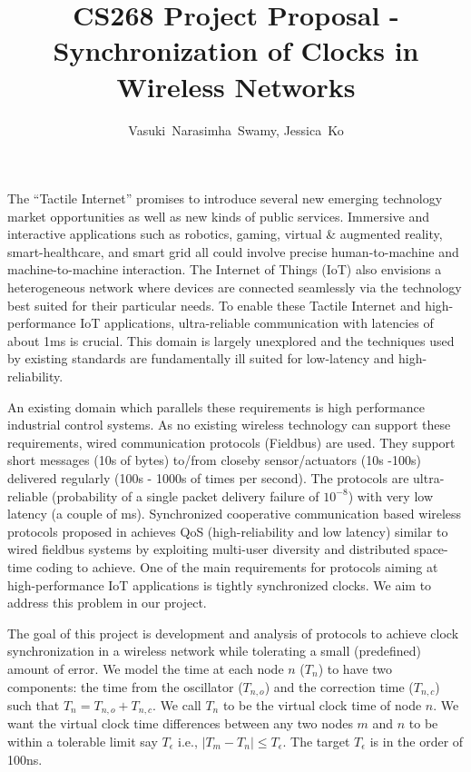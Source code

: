 \documentclass[11pt, draftclsnofoot, onecolumn]{IEEEtran}
\begin{document}
\title{CS268 Project Proposal - Synchronization of Clocks in Wireless Networks}

\author{Vasuki~Narasimha~Swamy,
	Jessica~Ko}

\maketitle

The ``Tactile Internet'' promises to introduce several new emerging technology market opportunities as well as new kinds of public services. Immersive and interactive applications such as robotics, gaming, virtual \& augmented reality, smart-healthcare, and smart grid all could involve precise human-to-machine and machine-to-machine interaction.
The Internet of Things (IoT) also envisions a heterogeneous network where devices are connected seamlessly via the technology best suited for their particular needs.
To enable these Tactile Internet and high-performance IoT applications, ultra-reliable communication with latencies of about 1ms is crucial.
This domain is largely unexplored and the techniques used by existing standards are fundamentally ill suited for low-latency and high-reliability. %

An existing domain which parallels these requirements is high performance industrial control systems.
As no existing wireless technology can support these requirements, wired communication protocols (Fieldbus) are used.
They support short messages (10s of bytes) to/from closeby sensor/actuators (10s -100s) delivered regularly (100s - 1000s of times per second). The protocols are ultra-reliable (probability of a single packet delivery failure of $10^{-8}$) with very low latency (a couple of ms).
Synchronized cooperative communication based wireless protocols proposed in \cite{swamy2015cooperative, swamy2016cooperative} achieves QoS (high-reliability and low latency) similar to wired fieldbus systems by exploiting multi-user diversity and distributed space-time coding to achieve.
One of the main requirements for protocols aiming at high-performance IoT applications is tightly synchronized clocks. We aim to address this problem in our project.

The goal of this project is development and analysis of protocols to achieve clock synchronization in a wireless network while tolerating a small (predefined) amount of error.
We model the time at each node $n$ ($T_n$) to have two components: the time from the oscillator ($T_{n,o}$) and the correction time ($T_{n,c}$) such that $T_n = T_{n,o} + T_{n,c}$. We call $T_n$ to be the virtual clock time of node $n$. We want the virtual clock time differences between any two nodes $m$ and $n$ to be within a tolerable limit say $T_{\epsilon}$ i.e., $|T_m - T_n| \leq T_{\epsilon}$. The target $T_{\epsilon}$ is in the order of 100ns.
\end{document}
